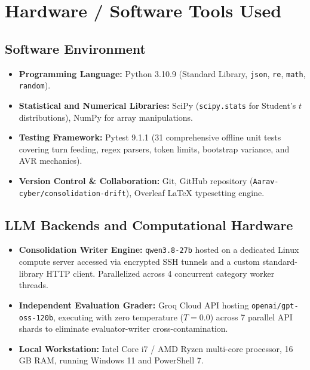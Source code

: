 \documentclass[12pt,a4paper]{report}
\begin{document}
\chapter{Hardware / Software Tools Used}

\section{Software Environment}
\begin{itemize}
    \item \textbf{Programming Language:} Python 3.10.9 (Standard Library, \texttt{json}, \texttt{re}, \texttt{math}, \texttt{random}).
    \item \textbf{Statistical and Numerical Libraries:} SciPy (\texttt{scipy.stats} for Student's $t$ distributions), NumPy for array manipulations.
    \item \textbf{Testing Framework:} Pytest 9.1.1 (31 comprehensive offline unit tests covering turn feeding, regex parsers, token limits, bootstrap variance, and AVR mechanics).
    \item \textbf{Version Control \& Collaboration:} Git, GitHub repository (\texttt{Aarav-cyber/consolidation-drift}), Overleaf \LaTeX{} typesetting engine.
\end{itemize}

\section{LLM Backends and Computational Hardware}
\begin{itemize}
    \item \textbf{Consolidation Writer Engine:} \texttt{qwen3.8-27b} hosted on a dedicated Linux compute server accessed via encrypted SSH tunnels and a custom standard-library HTTP client. Parallelized across 4 concurrent category worker threads.
    \item \textbf{Independent Evaluation Grader:} Groq Cloud API hosting \texttt{openai/gpt-oss-120b}, executing with zero temperature ($T=0.0$) across 7 parallel API shards to eliminate evaluator-writer cross-contamination.
    \item \textbf{Local Workstation:} Intel Core i7 / AMD Ryzen multi-core processor, 16 GB RAM, running Windows 11 and PowerShell 7.
\end{itemize}

\end{document}
